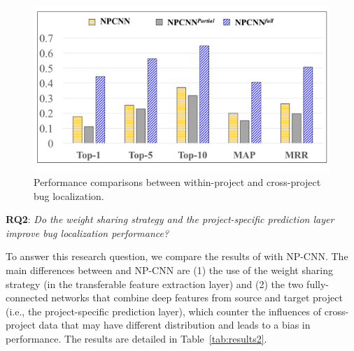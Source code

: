 \begin{table}[htbp]
  \label{tab:results1}%
\end{table}%

\begin{figure}[hbt]
\centering
\includegraphics[width = \columnwidth]{pic/results1_avg.pdf}
\caption{Performance comparisons between within-project and cross-project bug localization.}
\label{fig:results1}
\end{figure}

\textbf{RQ2}: \textit{Do the weight sharing strategy and the project-specific prediction layer improve bug localization performance?}

To answer this research question, we compare the results of \TRANPCNN with NP-CNN. The main differences between \TRANPCNN and NP-CNN are (1) the use of the weight sharing strategy (in the transferable feature extraction layer) and (2) the two fully-connected networks that combine deep features from source and target project (i.e., the project-specific prediction layer), which counter the influences of cross-project data that may have different distribution and leads to a bias in performance. The results are detailed in Table~\ref{tab:results2}.



